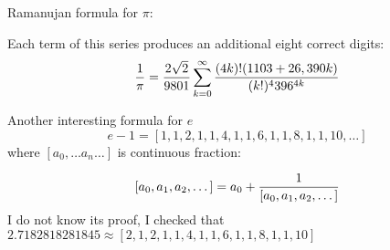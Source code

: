 


 Ramanujan formula for $\pi$:

 Each term of this series produces an additional eight
 correct digits:
                        $$
        {1\over\pi}=
        {2\sqrt 2\over 9801}
        \sum^\infty_{k=0}
                {
          (4k)!(1103+26,390 k)
             \over
             (k!)^4 396^{4k}
                 }        $$


   Another interesting formula for $e$
           $$
         e-1=[1,1,2,1,1,4,1,1,6,1,1,8,1,1,10,\dots]
             $$
    where $[a_0,\dots a_n\dots]$ is continuous fraction:

    $$
    [a_0,a_1,a_2,\dots]=a_0+{1\over [a_0,a_1,a_2,\dots]}
    $$
 I do not know its proof, I checked that
   $2.7182818281845\approx [2,1,2,1,1,4,1,1,6,1,1,8,1,1,10]$


\bye
